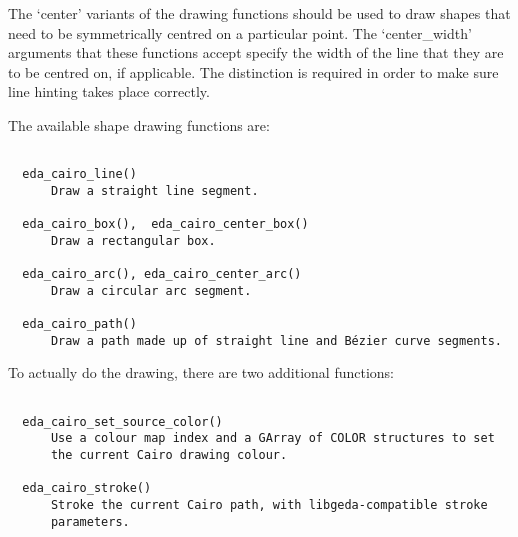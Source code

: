   The `center' variants of the drawing functions should be used to draw shapes that need to be symmetrically centred on a particular point. The `center\_width' arguments that these functions accept specify the width of the line that they are to be centred on, if applicable. The distinction is required in order to make sure line hinting takes place correctly.


  The available shape drawing functions are: \begin{verbatim}

  eda_cairo_line()
      Draw a straight line segment.

  eda_cairo_box(),  eda_cairo_center_box()
      Draw a rectangular box.

  eda_cairo_arc(), eda_cairo_center_arc()
      Draw a circular arc segment.

  eda_cairo_path()
      Draw a path made up of straight line and Bézier curve segments.

\end{verbatim}
 To actually do the drawing, there are two additional functions: \begin{verbatim}

  eda_cairo_set_source_color()
      Use a colour map index and a GArray of COLOR structures to set
      the current Cairo drawing colour.

  eda_cairo_stroke()
      Stroke the current Cairo path, with libgeda-compatible stroke
      parameters.

\end{verbatim}

